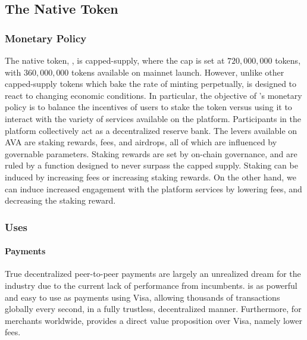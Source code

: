 \documentclass[runningheads]{llncs}
\begin{document}
\subsection{The \AVATokenName{} Native Token}

\subsubsection{Monetary Policy}
The native token, \AVATokenName{}, is capped-supply, where the cap is set at $720,000,000$ tokens, with $360,000,000$ tokens available on mainnet launch. However, unlike other capped-supply tokens which bake the rate of minting perpetually, \AVATokenName{} is designed to react to changing economic conditions. In particular, the objective of \AVATokenName{}'s monetary policy is to balance the incentives of users to stake the token versus using it to interact with the variety of services available on the platform. Participants in the platform collectively act as a decentralized reserve bank. The levers available on AVA are staking rewards, fees, and airdrops, all of which are influenced by governable parameters. Staking rewards are set by on-chain governance, and are ruled by a function designed to never surpass the capped supply. Staking can be induced by increasing fees or increasing staking rewards. On the other hand, we can induce increased engagement with the \AVAPlatformName{} platform services by lowering fees, and decreasing the staking reward. 

\subsubsection{Uses}
\paragraph{Payments}
True decentralized peer-to-peer payments are largely an unrealized dream for the industry due to the current lack of performance from incumbents. \AVATokenName{} is as powerful and easy to use as payments using Visa, allowing thousands of transactions globally every second, in a fully trustless, decentralized manner. Furthermore, for merchants worldwide, \AVATokenName{} provides a direct value proposition over Visa, namely lower fees.
\end{document}
